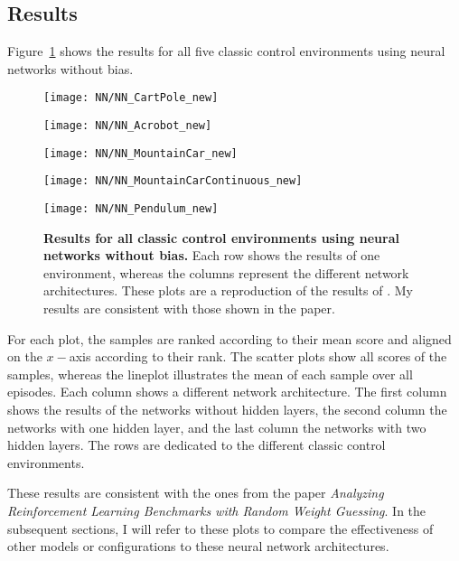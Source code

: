 \subsection{Results}
Figure~\ref{fig:results_NN} shows the results for all five classic control environments using neural networks without bias.
\begin{figure}
  \centering
  \texttt{[image: NN/NN\_CartPole\_new]}

      \vspace{0.2cm}

  \texttt{[image: NN/NN\_Acrobot\_new]}

      \vspace{0.2cm}

  \texttt{[image: NN/NN\_MountainCar\_new]}

      \vspace{0.2cm}

  \texttt{[image: NN/NN\_MountainCarContinuous\_new]}

      \vspace{0.2cm}

  \texttt{[image: NN/NN\_Pendulum\_new]}
\caption[Results for all classic control environments using neural networks without bias]{
  \textbf{Results for all classic control environments using neural networks without bias.}
   Each row shows the results of one environment, whereas the columns represent the different network architectures. These plots are a reproduction of the results of \cite{oller_analyzing_2020}. My results are consistent with those shown in the paper.
}
\label{fig:results_NN}
\end{figure}
For each plot, the samples are ranked according to their mean score and aligned on the $x-$axis according to their rank. The scatter plots show all scores of the samples, whereas the lineplot illustrates the mean of each sample over all episodes. Each column shows a different network architecture. The first column shows the results of the networks without hidden layers, the second column the networks with one hidden layer, and the last column the networks with two hidden layers. The rows are dedicated to the different classic control environments.

These results are consistent with the ones from the paper \emph{Analyzing Reinforcement Learning Benchmarks with Random Weight Guessing}. In the subsequent sections, I will refer to these plots to compare the effectiveness of other models or configurations to these neural network architectures.

